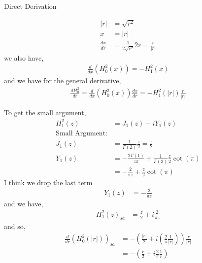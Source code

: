 \documentclass{article}
\newcommand{\0}{\varnothing}
\begin{document}
\begin{minipage}[t]{0.5\textwidth}
{\centering Direct Derivation\ \\}

\begin{align*}
	|r| &= \sqrt{r^2}\\
	x &= |r| \\
	\frac{dx}{dr} &= \frac{1}{2 \sqrt{r^2}} 2 r = \frac{r}{|r|}
\end{align*}
we also have,
\begin{align*}
	\frac{d}{dx}(H_0^2 (x)) = -H_1^2(x)
\end{align*}
and we have for the general derivative,
\begin{align*}
	\frac{dH_0^2}{dr} = \frac{d}{dx}(H_0^2 (x)) \frac{dx}{dr} = -H_1^2(|r|) \frac{r}{|r|}
\end{align*}

To get the small argument, 
\begin{align*}
	H_1^2(z) &= J_1(z) - i Y_1(z) \\
	\text{Small Argument:}& \\
	J_1(z) &= \frac{1}{\Gamma(2)} \frac{z}{2} = \frac{z}{2}\\
 	Y_1(z) &= -\frac{2\Gamma(1)}{z\pi} + \frac{1}{\Gamma(2)} \frac{z}{2} \cot(\pi) \\
 		   &= -\frac{2}{\pi z} + \frac{z}{2} \cot(\pi)
\end{align*}
I think we drop the last term
\begin{align*}
	 Y_1(z) &= -\frac{2}{\pi z}
\end{align*}
and we have,
\begin{align*}
     H_1^2(z)_{sa} &= \frac{z}{2} + i  \frac{2}{\pi z}
\end{align*}
and so,	 
\begin{align*}
	\frac{d}{dr} \left( H_0^2(|r|) \right)_{sa} &= -\left(\frac{|r|}{2} + i \left(\frac{2}{\pi} \frac{1}{|r|} \right)\right) \frac{r}{|r|}\\
    &= -\left(\frac{r}{2} + i \frac{2}{\pi} \frac{1}{r} \right)
\end{align*}

\end{minipage}
\end{document}
